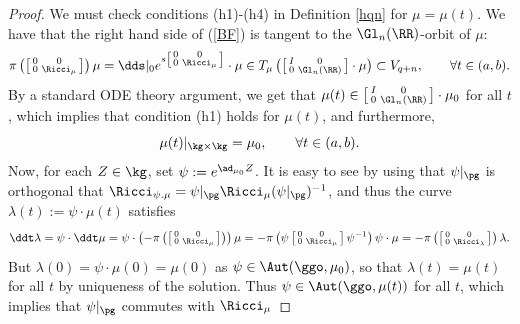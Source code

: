 \documentclass[11pt]{amsart}
\theoremstyle{plain}
\theoremstyle{definition}
\theoremstyle{remark}
\begin{document}
\begin{proof}
We must check conditions (h1)-(h4) in Definition \ref{hqn} for $\mu=\mu(t)$.  We have that the right hand side of (\ref{BF}) is tangent to the $\Gl_n(\RR)$-orbit of $\mu$:
$$
\pi\left(\left[\begin{smallmatrix} 0&0\\ 0&\Ricci_{\mu}
\end{smallmatrix}\right]\right)\mu =\dds|_0 e^{s\left[\begin{smallmatrix} 0&0\\ 0&\Ricci_{\mu}
\end{smallmatrix}\right]}\cdot\mu \in T_{\mu}\left(\left[\begin{smallmatrix} I&0\\ 0&\Gl_n(\RR)
\end{smallmatrix}\right]\cdot\mu\right)\subset V_{q+n}, \qquad\forall t\in (a,b).
$$
By a standard ODE theory argument, we get that $\mu(t)\in \left[\begin{smallmatrix} I&0\\ 0&\Gl_n(\RR)
\end{smallmatrix}\right]\cdot\mu_0$ for all
$t$, which implies that condition (h1) holds for $\mu(t)$, and furthermore,
\begin{equation}\label{muk}
\mu(t)|_{\kg\times\kg}=\mu_0, \qquad\forall t\in (a,b).
\end{equation}
Now, for each $Z\in\kg$, set $\psi:=e^{\ad_{\mu_0}{Z}}$.  It is easy to see by using that
$\psi|_{\pg}$ is orthogonal that
$\Ricci_{\psi.\mu}=\psi|_{\pg}\Ricci_{\mu}(\psi|_{\pg})^{-1}$, and thus the curve
$\lambda(t):=\psi\cdot\mu(t)$ satisfies
$$
\ddt\lambda=\psi\cdot\ddt\mu=\psi\cdot\left(-\pi\left(\left[\begin{smallmatrix} 0&0\\
0&\Ricci_{\mu}
\end{smallmatrix}\right]\right)\right)\mu = -\pi\left(\psi\left[\begin{smallmatrix} 0&0\\ 0&\Ricci_{\mu}
\end{smallmatrix}\right]\psi^{-1}\right)\psi\cdot\mu= -\pi\left(\left[\begin{smallmatrix} 0&0\\ 0&\Ricci_{\lambda}
\end{smallmatrix}\right]\right)\lambda.
$$
But $\lambda(0)=\psi\cdot\mu(0)=\mu(0)$ as $\psi\in\Aut(\ggo,\mu_0)$, so that
$\lambda(t)=\mu(t)$ for all $t$ by uniqueness of the solution.  Thus $\psi\in\Aut(\ggo,\mu(t))$ for all $t$, which implies that $\psi|_{\pg}$ commutes with $\Ricci_{\mu}$

\end{proof}
\end{document}
